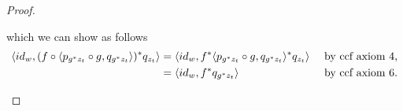 \begin{proof}
\begin{enumerate}[(i)]
which we can show as follows
\begin{align*}
\langle id_w,(f \circ \langle p_{g^*z_t} \circ g, q_{g^*z_t}\rangle )^* q_{z_t}\rangle
    &= \langle id_w,f ^* \langle p_{g^*z_t} \circ g, q_{g^*z_t}\rangle ^* q_{z_t}\rangle &&\mbox{ by ccf axiom 4,}\\
		&= \langle id_w,f ^*  q_{g^*z_t}\rangle  &&\mbox{ by ccf axiom 6.}\\
\end{align*}

\end{enumerate}
\end{proof}





